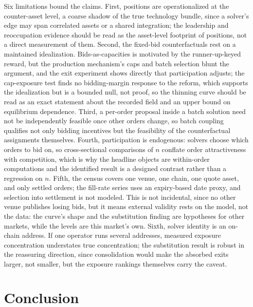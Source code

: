\documentclass[11pt]{article}
\theoremstyle{plain}
\theoremstyle{definition}
\theoremstyle{remark}
\begin{document}
Six limitations bound the claims. First, positions are operationalized at the counter-asset level, a coarse shadow of the true technology bundle, since a solver's edge may span correlated assets or a shared integration; the leadership and reoccupation evidence should be read as the asset-level footprint of positions, not a direct measurement of them. Second, the fixed-bid counterfactuals rest on a maintained idealization. Bids-as-capacities is motivated by the runner-up-keyed reward, but the production mechanism's caps and batch selection blunt the argument, and the exit experiment shows directly that participation adjusts; the cap-exposure test finds no bidding-margin response to the reform, which supports the idealization but is a bounded null, not proof, so the thinning curve should be read as an exact statement about the recorded field and an upper bound on equilibrium dependence. Third, a per-order proposal inside a batch solution need not be independently feasible once other orders change, so batch coupling qualifies not only bidding incentives but the feasibility of the counterfactual assignments themselves. Fourth, participation is endogenous: solvers choose which orders to bid on, so cross-sectional comparisons of $n$ conflate order attractiveness with competition, which is why the headline objects are within-order computations and the identified result is a designed contrast rather than a regression on $n$. Fifth, the census covers one venue, one chain, one quote asset, and only settled orders; the fill-rate series uses an expiry-based date proxy, and selection into settlement is not modeled. This is not incidental, since no other venue publishes losing bids, but it means external validity rests on the model, not the data: the curve's shape and the substitution finding are hypotheses for other markets, while the levels are this market's own. Sixth, solver identity is an on-chain address. If one operator runs several addresses, measured exposure concentration understates true concentration; the substitution result is robust in the reassuring direction, since consolidation would make the absorbed exits larger, not smaller, but the exposure rankings themselves carry the caveat.

\section{Conclusion}
\end{document}
